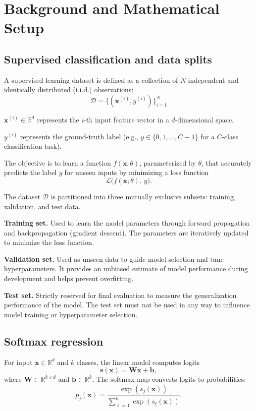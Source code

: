 \documentclass[sigconf,screen,nonacm]{acmart}
\newcommand{\vx}{\mathbf{x}}
\newcommand{\vs}{\mathbf{s}}
\newcommand{\vb}{\mathbf{b}}
\newcommand{\mW}{\mathbf{W}}
\newcommand{\R}{\mathbb{R}}
\begin{document}
\section{Background and Mathematical Setup}

\subsection{Supervised classification and data splits}
A supervised learning dataset is defined as a collection of $N$ independent and identically distributed (i.i.d.) observations:
\[
\mathcal{D} = \{(\mathbf{x}^{(i)}, y^{(i)})\}_{i=1}^{N}
\]

\noindent
$\mathbf{x}^{(i)} \in \mathbb{R}^{d}$ represents the $i$-th input feature vector in a $d$-dimensional space.

\noindent
$y^{(i)}$ represents the ground-truth label (e.g., $y \in \{0, 1, \dots, C-1\}$ for a $C$-class classification task).

\noindent
The objective is to learn a function $f(\mathbf{x}; \theta)$, parameterized by $\theta$, that accurately predicts the label $y$ for unseen inputs by minimizing a loss function
\[
\mathcal{L}\!\big(f(\mathbf{x}; \theta),\, y\big).
\]

The dataset $\mathcal{D}$ is partitioned into three mutually exclusive subsets: training, validation, and test data.

\medskip\noindent\textbf{Training set.} Used to learn the model parameters through forward propagation and backpropagation (gradient descent). The parameters are iteratively updated to minimize the loss function.

\medskip\noindent\textbf{Validation set.} Used as unseen data to guide model selection and tune hyperparameters. It provides an unbiased estimate of model performance during development and helps prevent overfitting.

\medskip\noindent\textbf{Test set.} Strictly reserved for final evaluation to measure the generalization performance of the model. The test set must not be used in any way to influence model training or hyperparameter selection.

\subsection{Softmax regression}
For input $\vx \in \R^d$ and $k$ classes, the linear model computes logits
\begin{equation}
    \vs(\vx) = \mW \vx + \vb,
\end{equation}
where $\mW \in \R^{k \times d}$ and $\vb \in \R^k$. The softmax map converts logits to probabilities:
\begin{equation}
    p_j(\vx) = \frac{\exp(s_j(\vx))}{\sum_{\ell=1}^{k} \exp(s_{\ell}(\vx))}.
\end{equation}
\end{document}
